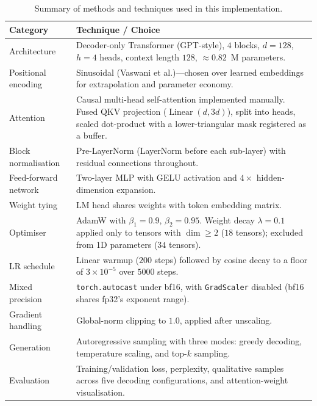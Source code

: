\begin{table}[H]
\centering
\caption{Summary of methods and techniques used in this implementation.}
\label{tab:approach-summary}
\small
\begin{tabular}{p{3.2cm} p{10.5cm}}
\toprule
\textbf{Category} & \textbf{Technique / Choice} \\
\midrule
Architecture          & Decoder-only Transformer (GPT-style), $4$ blocks,
                        $d = 128$, $h = 4$ heads, context length $128$,
                        $\approx 0.82$~M parameters. \\
Positional encoding   & Sinusoidal (Vaswani et al.)---chosen over learned
                        embeddings for extrapolation and parameter
                        economy. \\
Attention             & Causal multi-head self-attention implemented
                        manually. Fused QKV projection
                        ($\operatorname{Linear}(d, 3d)$), split into heads,
                        scaled dot-product with a lower-triangular mask
                        registered as a buffer. \\
Block normalisation   & Pre-LayerNorm (LayerNorm before each sub-layer)
                        with residual connections throughout. \\
Feed-forward network  & Two-layer MLP with GELU activation and
                        $4\times$ hidden-dimension expansion. \\
Weight tying          & LM head shares weights with token embedding
                        matrix. \\
Optimiser             & AdamW with $\beta_1 = 0.9$, $\beta_2 = 0.95$.
                        Weight decay $\lambda = 0.1$ applied only to
                        tensors with $\dim \geq 2$ ($18$ tensors); excluded
                        from 1D parameters ($34$ tensors). \\
LR schedule           & Linear warmup ($200$ steps) followed by cosine
                        decay to a floor of $3 \times 10^{-5}$ over
                        $5000$ steps. \\
Mixed precision       & \texttt{torch.autocast} under bf16, with
                        \texttt{GradScaler} disabled (bf16 shares fp32's
                        exponent range). \\
Gradient handling     & Global-norm clipping to $1.0$, applied after
                        unscaling. \\
Generation            & Autoregressive sampling with three modes: greedy
                        decoding, temperature scaling, and top-$k$
                        sampling. \\
Evaluation            & Training/validation loss, perplexity, qualitative
                        samples across five decoding configurations, and
                        attention-weight visualisation. \\
\bottomrule
\end{tabular}
\end{table}

